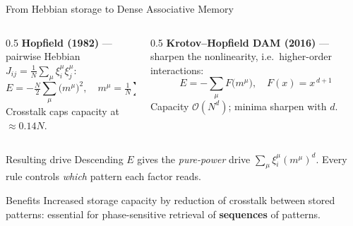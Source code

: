 \documentclass[aspectratio=169]{beamer}
\newcommand{\xxi}{\xi}
\newcommand{\mvar}{m}
\begin{document}
\begin{frame}{From Hebbian storage to Dense Associative Memory}
  \begin{columns}[T]
    \begin{column}{0.5\textwidth}
      \textbf{Hopfield (1982)} --- pairwise Hebbian
      $J_{ij} = \frac{1}{N}\sum_\mu \xxi_i^\mu \xxi_j^\mu$:
      \[
        E = -\tfrac{N}{2}\sum_\mu \bigl(\mvar^\mu\bigr)^2 ,\quad
        \mvar^\mu = \tfrac1N \sum_j \xxi^\mu_j s_j
      \]
      Crosstalk caps capacity at $\approx 0.14N$.
    \end{column}
    \begin{column}{0.5\textwidth}
      \textbf{Krotov--Hopfield DAM (2016)} --- sharpen the nonlinearity,
      i.e.\ higher-order interactions:
      \[
        E = -\sum_\mu F\bigl(\mvar^\mu\bigr), \quad F(x) = x^{\,d+1}
      \]
      Capacity $\mathcal{O}(N^{d})$; minima sharpen with $d$.
    \end{column}
  \end{columns}
  \vspace{1.5mm}
  \begin{block}{Resulting drive}
    Descending $E$ gives the \emph{pure-power} drive
    $\sum_\mu \xxi_i^\mu (\mvar^\mu)^{d}$. Every rule controls
    \emph{which} pattern each factor reads.
  \end{block}
  \begin{block}{Benefits}
    Increased storage capacity by reduction of crosstalk between stored patterns: essential for phase-sensitive retrieval of \textbf{sequences} of patterns. 
  \end{block}
\end{frame}
\end{document}
